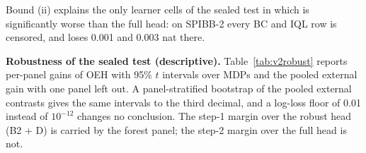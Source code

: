 Bound (ii) explains the only learner cells of the sealed test in which \OEH{} is significantly worse than the full head: on SPIBB-2 every BC and IQL row is censored, and \OEH{} loses 0.001 and 0.003 nat there.

\textbf{Robustness of the sealed test (descriptive).} Table~\ref{tab:v2robust} reports per-panel gains of OEH with 95\% $t$ intervals over MDPs and the pooled external gain with one panel left out. A panel-stratified bootstrap of the pooled external contrasts gives the same intervals to the third decimal, and a log-loss floor of 0.01 instead of $10^{-12}$ changes no conclusion. The step-1 margin over the robust head (B2 + D) is carried by the forest panel; the step-2 margin over the full head is not.

\begin{table}[t]
\centering
\caption{Gain of \OEH{} (positive favors \OEH{}), mean with 95\% interval.}
\label{tab:v2robust}
\footnotesize
\setlength{\tabcolsep}{2pt}
\end{table}
